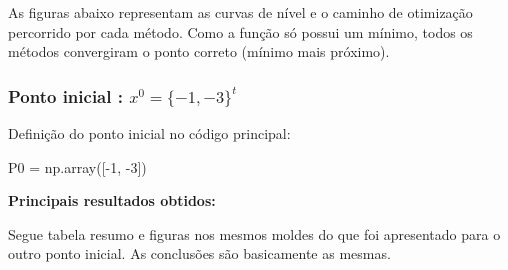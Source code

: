\documentclass[10pt, a4paper]{article}
\begin{document}
As figuras abaixo representam as curvas de nível e o caminho de otimização percorrido por cada método. Como a função 
só possui um mínimo, todos os métodos convergiram o ponto correto (mínimo mais próximo).




\subsubsection{Ponto inicial : $x^0 = \{-1,-3\}^t$}
Definição do ponto inicial no código principal:
\begin{python}
  P0 = np.array([-1, -3])
\end{python}

\vspace{3mm}
\textbf{Principais resultados obtidos:}

\vspace{3mm}
Segue tabela resumo e figuras nos mesmos moldes do que foi apresentado para o outro ponto inicial.
As conclusões são basicamente as mesmas.
\end{document}
